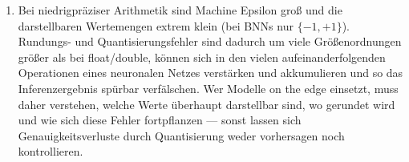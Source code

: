 \documentclass[a4paper,11pt]{scrartcl}
\begin{document}
\begin{enumerate}[label=(\alph*)]
  \item Bei niedrigpräziser Arithmetik sind Machine Epsilon groß und die darstellbaren Wertemengen extrem klein (bei BNNs nur $\{-1, +1\}$). Rundungs- und Quantisierungsfehler sind dadurch um viele Größenordnungen größer als bei float/double, können sich in den vielen aufeinanderfolgenden Operationen eines neuronalen Netzes verstärken und akkumulieren und so das Inferenzergebnis spürbar verfälschen. Wer Modelle on the edge einsetzt, muss daher verstehen, welche Werte überhaupt darstellbar sind, wo gerundet wird und wie sich diese Fehler fortpflanzen --- sonst lassen sich Genauigkeitsverluste durch Quantisierung weder vorhersagen noch kontrollieren.
\end{enumerate}
\end{document}
